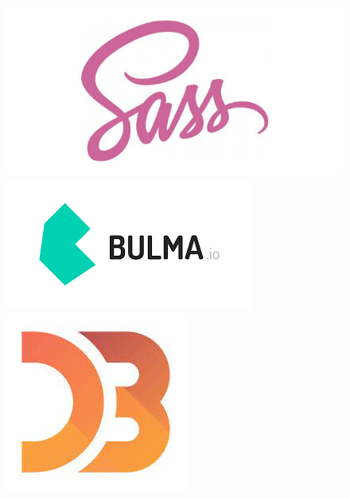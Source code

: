 \documentclass{beamer}
\begin{document}
\begin{frame}
\begin{figure}
\begin{columns}
\begin{column}{.3\textwidth}
					\includegraphics[height=.15\textheight]{sass.jpg}
					\includegraphics[height=.15\textheight]{bulma.png}
					\includegraphics[height=.15\textheight]{d3.jpeg}			
			\end{column}
		\end{columns}
	\end{figure}
\end{frame}
\end{document}
